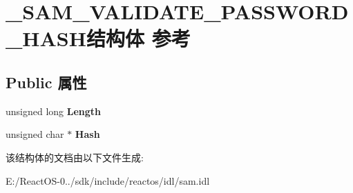 \hypertarget{struct___s_a_m___v_a_l_i_d_a_t_e___p_a_s_s_w_o_r_d___h_a_s_h}{}\section{\+\_\+\+S\+A\+M\+\_\+\+V\+A\+L\+I\+D\+A\+T\+E\+\_\+\+P\+A\+S\+S\+W\+O\+R\+D\+\_\+\+H\+A\+S\+H结构体 参考}
\label{struct___s_a_m___v_a_l_i_d_a_t_e___p_a_s_s_w_o_r_d___h_a_s_h}
\subsection*{Public 属性}
\begin{DoxyCompactItemize}
\item 
\mbox{\label{struct___s_a_m___v_a_l_i_d_a_t_e___p_a_s_s_w_o_r_d___h_a_s_h_a7868aca38fc0be294fb696995a537c7f}} 
unsigned long {\bfseries Length}
\item 
\mbox{\label{struct___s_a_m___v_a_l_i_d_a_t_e___p_a_s_s_w_o_r_d___h_a_s_h_a8a64c54b07b60d90b18eca1cacf201f9}} 
unsigned char $\ast$ {\bfseries Hash}
\end{DoxyCompactItemize}


该结构体的文档由以下文件生成\+:\begin{DoxyCompactItemize}
\item 
E\+:/\+React\+O\+S-\/0../sdk/include/reactos/idl/sam.\+idl\end{DoxyCompactItemize}
